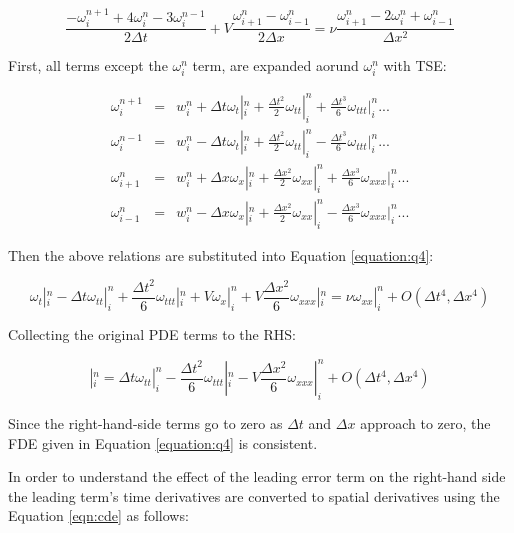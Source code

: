 \documentclass[letterpaper,12pt]{article}
\begin{document}
\begin{equation}
	\frac{-\omega^{n+1}_{i}+4\omega^{n}_{i}-3\omega^{n-1}_{i}}{2\Delta t} + V\frac{\omega^{n}_{i+1}-\omega^{n}_{i-1}}{2\Delta x} = \nu\frac{\omega^{n}_{i+1}-2\omega^{n}_{i}+\omega^{n}_{i-1}}{\Delta x^2}
	\label{equation:q4}
\end{equation}

First, all terms except the $\omega^{n}_{i}$ term, are expanded aorund $\omega^{n}_{i}$ with TSE:

\begin{eqnarray}
	\omega^{n+1}_i &=& w^n_i + \Delta t \omega_t|^n_i + \frac{\Delta t^2}{2} \omega_{tt}|^n_i + \frac{\Delta t^3}{6} \omega_{ttt}|^n_i ... \nonumber \\
	\omega^{n-1}_i &=& w^n_i - \Delta t \omega_t|^n_i + \frac{\Delta t^2}{2} \omega_{tt}|^n_i - \frac{\Delta t^3}{6} \omega_{ttt}|^n_i ... \nonumber \\
	\omega^n_{i+1} &=& w^n_i + \Delta x \omega_x|^n_i + \frac{\Delta x^2}{2} \omega_{xx}|^n_i + \frac{\Delta x^3}{6} \omega_{xxx}|^n_i ... \nonumber \\
	\omega^n_{i-1} &=& w^n_i - \Delta x \omega_x|^n_i + \frac{\Delta x^2}{2} \omega_{xx}|^n_i - \frac{\Delta x^3}{6} \omega_{xxx}|^n_i ... 
\end{eqnarray}

Then the above relations are substituted into Equation \ref{equation:q4}:

\begin{equation}
	\omega_t|^n_i - \Delta t \omega_{tt}|^n_i + \frac{\Delta t^2}{6} \omega_{ttt}|^n_i + V\omega_x|^n_i + V\frac{\Delta x^2}{6}\omega_{xxx}|^n_i = \nu\omega_{xx}|^n_i + O(\Delta t^4,\Delta x^4)
\end{equation}

Collecting the original PDE terms to the RHS:

\begin{equation}
	[\omega_t + V\omega_x - \nu\omega_{xx}]|^n_i = \Delta t \omega_{tt}|^n_i - \frac{\Delta t^2}{6} \omega_{ttt}|^n_i - V\frac{\Delta x^2}{6}\omega_{xxx}|^n_i + O(\Delta t^4,\Delta x^4)
	\label{equation:consistency}
\end{equation}

Since the right-hand-side terms go to zero as $\Delta t$ and $\Delta x$ approach to zero, the FDE given
in Equation \ref{equation:q4} is consistent.

In order to understand the effect of the leading error term on the right-hand side the leading term's time
derivatives are converted to spatial derivatives using the Equation \ref{eqn:cde} as follows:
\end{document}
